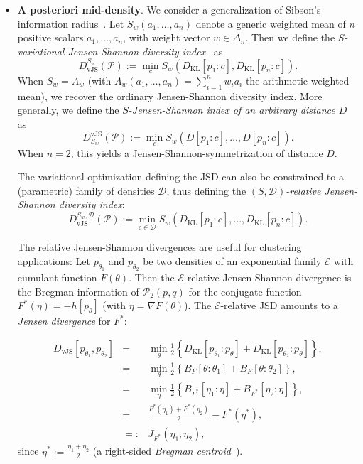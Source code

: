\documentclass[11pt]{article}
\def\calE{\mathcal{E}}
\def\calD{\mathcal{D}}
\def\calP{\mathcal{P}}
\def\KL{\mathrm{KL}}
\def\vJS{\mathrm{vJS}}
\begin{document}
\begin{itemize}
	\item {\bf A posteriori mid-density}.
	We consider a generalization of Sibson's information radius~\citep{Sibson-1969}.
	Let $S_w(a_1,\ldots,a_n)$ denote a generic weighted mean of $n$ positive scalars $a_1,\ldots, a_n$, with weight vector $w\in\Delta_n$.
	Then we define the {\em $S$-variational Jensen-Shannon diversity index}~\citep{vJSD-2021} as
	\begin{equation}
	D_\vJS^{S_w}(\calP) := \min_{c} S_w\left(D_\KL[p_1:c],D_\KL[p_n:c]\right).
	\end{equation}
	When $S_w=A_w$ (with $A_w(a_1,\ldots,a_n)=\sum_{i=1}^n w_i a_i$ the arithmetic weighted mean), we recover the ordinary Jensen-Shannon diversity index.
			More generally, we define the {\em $S$-Jensen-Shannon index of an arbitrary distance $D$} as
	\begin{equation}
D^\vJS_{S_w}(\calP):=\min_{c} S_w\left(D[p_1:c],\ldots, D[p_n:c]\right).	
\end{equation}
When $n=2$, this yields a Jensen-Shannon-symmetrization of distance $D$.

The variational optimization defining the JSD can also be constrained to a (parametric) family of densities $\calD$, thus defining 
	the {\em $(S,\calD)$-relative Jensen-Shannon diversity index}:
	\begin{equation}
	D_\vJS^{S_w,\calD}(\calP) := \min_{c\in\calD} S_w\left(D_\KL[p_1:c],\ldots, D_\KL[p_n:c]\right).
	\end{equation}
	

The relative Jensen-Shannon divergences are useful for clustering applications:
Let $p_{\theta_1}$ and $p_{\theta_2}$ be two densities of an exponential family $\mathcal{E}$ with cumulant function $F(\theta)$.
Then the $\mathcal{E}$-relative Jensen-Shannon divergence is the Bregman information of $\calP_2(p,q)$ for the conjugate function $F^*(\eta)=-h[p_\theta]$ 
(with $\eta=\nabla F(\theta)$). The $\calE$-relative JSD amounts to  a {\em Jensen divergence} for $F^*$:

\begin{eqnarray}
D_\vJS[p_{\theta_1},p_{\theta_2}] &=& \min_\theta \frac{1}{2}\left\{D_\KL[p_{\theta_1}:p_{\theta}]+D_\KL[p_{\theta_2}:p_{\theta}]\right\},\\
 &=& \min_\theta \frac{1}{2}\left\{B_F[\theta:\theta_1]+B_F[\theta:\theta_2]\right\},\\
 &=&  \min_\eta  \frac{1}{2}\left\{B_{F^*}[\eta_1:\eta]+B_{F^*}[\eta_2:\eta]\right\},\\
&=& \frac{F^*(\eta_1)+F^*(\eta_2)}{2}-F^*(\eta^*),\\
&=:& J_{F^*}(\eta_1,\eta_2),
\end{eqnarray}
since $\eta^*:=\frac{\eta_1+\eta_2}{2}$ (a right-sided {\em Bregman centroid}~\cite{SBD-2009}).


\end{itemize}
\end{document}
